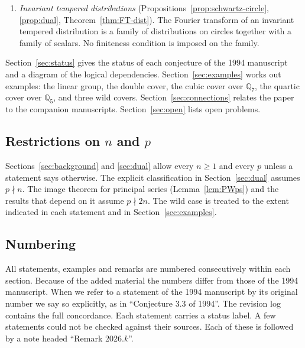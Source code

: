 \documentclass[12pt,letterpaper]{article}
\numberwithin{equation}{section}
\theoremstyle{definition}
\newcommand{\Q}{\mathbb Q}
\begin{document}
\begin{enumerate}[label=(\arabic*),leftmargin=*,itemsep=2pt]
Paley--Wiener theorems are restated on the irreducible duals, with the compatibility
relations of Example~\ref{ex:intro-linear}.  Necessity is proved.  Sufficiency is reduced
to the theorem of Bernstein, Deligne and Kazhdan for covers and to Li's tempered
Paley--Wiener theorem.
\item \emph{Invariant tempered distributions} (Propositions~\ref{prop:schwartz-circle},
\ref{prop:dual}, Theorem~\ref{thm:FT-dist}).  The Fourier transform of an invariant
tempered distribution is a family of distributions on circles together with a family of
scalars.  No finiteness condition is imposed on the family.
\end{enumerate}

Section~\ref{sec:status} gives the status of each conjecture of the 1994 manuscript and a
diagram of the logical dependencies.  Section~\ref{sec:examples} works out examples: the
linear group, the double cover, the cubic cover over $\Q_7$, the quartic cover over
$\Q_5$, and three wild covers.  Section~\ref{sec:connections} relates the paper to the
companion manuscripts.  Section~\ref{sec:open} lists open problems.

\subsection*{Restrictions on $n$ and $p$}
Sections~\ref{sec:background} and \ref{sec:dual} allow every $n\ge1$ and every $p$ unless
a statement says otherwise.  The explicit classification in Section~\ref{sec:dual} assumes
$p\nmid n$.  The image theorem for principal series (Lemma~\ref{lem:PWps}) and the results
that depend on it assume $p\nmid 2n$.  The wild case is treated to the extent indicated in
each statement and in Section~\ref{sec:examples}.

\subsection*{Numbering}
All statements, examples and remarks are numbered consecutively within each section.
Because of the added material the numbers differ from those of the 1994 manuscript.
When we refer to a statement of the 1994 manuscript by its original number we say so
explicitly, as in ``Conjecture 3.3 of 1994''.  The revision log contains the full
concordance.  Each statement carries a status label.  A few statements could not be
checked against their sources.  Each of these is followed by a note headed
``Remark 2026.$k$''.
\end{document}
